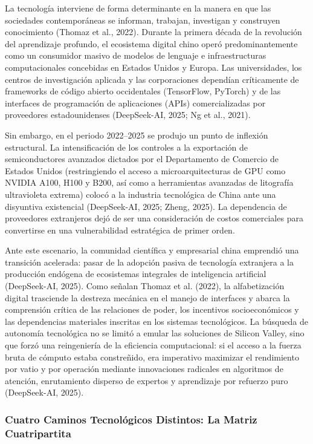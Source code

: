 La tecnología interviene de forma determinante en la manera en que las sociedades contemporáneas se informan, trabajan, investigan y construyen conocimiento (Thomaz et al., 2022). Durante la primera década de la revolución del aprendizaje profundo, el ecosistema digital chino operó predominantemente como un consumidor masivo de modelos de lenguaje e infraestructuras computacionales concebidas en Estados Unidos y Europa. Las universidades, los centros de investigación aplicada y las corporaciones dependían críticamente de frameworks de código abierto occidentales (TensorFlow, PyTorch) y de las interfaces de programación de aplicaciones (APIs) comercializadas por proveedores estadounidenses (DeepSeek-AI, 2025; Ng et al., 2021).

Sin embargo, en el periodo 2022--2025 se produjo un punto de inflexión estructural. La intensificación de los controles a la exportación de semiconductores avanzados dictados por el Departamento de Comercio de Estados Unidos (restringiendo el acceso a microarquitecturas de GPU como NVIDIA A100, H100 y B200, así como a herramientas avanzadas de litografía ultravioleta extrema) colocó a la industria tecnológica de China ante una disyuntiva existencial (DeepSeek-AI, 2025; Zheng, 2025). La dependencia de proveedores extranjeros dejó de ser una consideración de costos comerciales para convertirse en una vulnerabilidad estratégica de primer orden.

Ante este escenario, la comunidad científica y empresarial china emprendió una transición acelerada: pasar de la adopción pasiva de tecnología extranjera a la producción endógena de ecosistemas integrales de inteligencia artificial (DeepSeek-AI, 2025). Como señalan Thomaz et al. (2022), la alfabetización digital trasciende la destreza mecánica en el manejo de interfaces y abarca la comprensión crítica de las relaciones de poder, los incentivos socioeconómicos y las dependencias materiales inscritas en los sistemas tecnológicos. La búsqueda de autonomía tecnológica no se limitó a emular las soluciones de Silicon Valley, sino que forzó una reingeniería de la eficiencia computacional: si el acceso a la fuerza bruta de cómputo estaba constreñido, era imperativo maximizar el rendimiento por vatio y por operación mediante innovaciones radicales en algoritmos de atención, enrutamiento disperso de expertos y aprendizaje por refuerzo puro (DeepSeek-AI, 2025).

\subsubsection{Cuatro Caminos Tecnológicos Distintos: La Matriz Cuatripartita}


